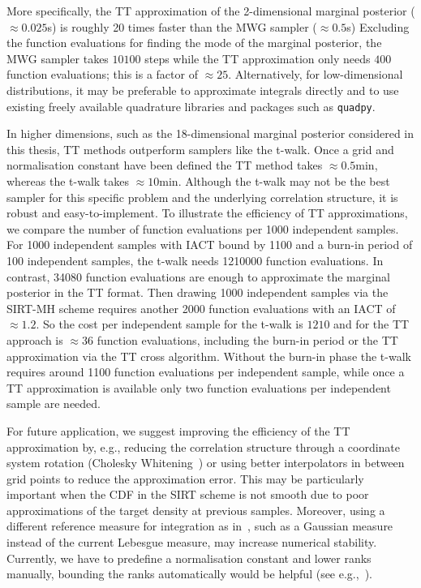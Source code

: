 More specifically, the TT approximation of the 2-dimensional marginal posterior ($\approx0.025$s) is roughly 20 times faster than the MWG sampler ($\approx0.5$s)
Excluding the function evaluations for finding the mode of the marginal posterior, the MWG sampler takes $10100$ steps while the TT approximation only needs $400$ function evaluations; this is a factor of $\approx25$.
Alternatively, for low-dimensional distributions, it may be preferable to approximate integrals directly and to use existing freely available quadrature libraries and packages such as \texttt{quadpy}.

In higher dimensions, such as the 18-dimensional marginal posterior considered in this thesis, TT methods outperform samplers like the t-walk.
Once a grid and normalisation constant have been defined the TT method takes $\approx0.5$min, whereas the t-walk takes $\approx 10$min.
Although the t-walk may not be the best sampler for this specific problem and the underlying correlation structure, it is robust and easy-to-implement.
To illustrate the efficiency of TT approximations, we compare the number of function evaluations per 1000 independent samples.
For 1000 independent samples with IACT bound by 1100 and a burn-in period of 100 independent samples, the t-walk needs 1210000 function evaluations. 
In contrast, 34080 function evaluations are enough to approximate the marginal posterior in the TT format.
Then drawing 1000 independent samples via the SIRT-MH scheme requires another 2000 function evaluations with an IACT of $\approx 1.2$.
So the cost per independent sample for the t-walk is $1210$ and for the TT approach is $\approx 36$ function evaluations, including the burn-in period or the TT approximation via the TT cross algorithm.
Without the burn-in phase the t-walk requires around 1100 function evaluations per independent sample, while once a TT approximation is available only two function evaluations per independent sample are needed.

For future application, we suggest improving the efficiency of the TT approximation by, e.g., reducing the correlation structure through a coordinate system rotation (Cholesky Whitening~\cite{KessyWhitening2018}) or using better interpolators in between grid points to reduce the approximation error.
This may be particularly important when the CDF in the SIRT scheme is not smooth due to poor approximations of the target density at previous samples.  
Moreover, using a different reference measure for integration as in~\cite{cui2022deep}, such as a Gaussian measure instead of the current Lebesgue measure, may increase numerical stability.
Currently, we have to predefine a normalisation constant and lower ranks manually, bounding the ranks automatically would be helpful (see e.g.,~\cite{Rohrbach2022tterror}).


